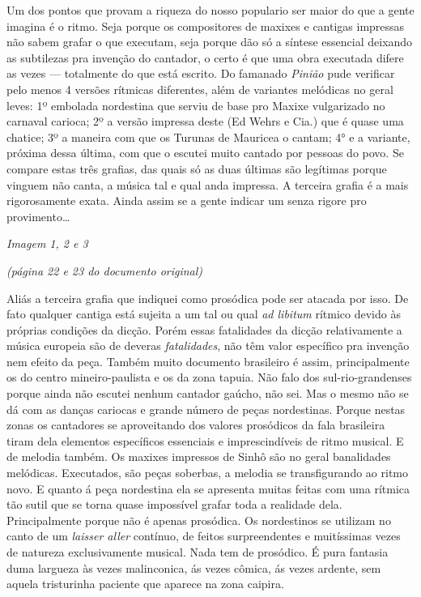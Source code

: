 Um dos pontos que provam a riqueza do nosso populario ser maior do que a
gente imagina é o ritmo. Seja porque os compositores de maxixes e
cantigas impressas não sabem grafar o que executam, seja porque dão só a
síntese essencial deixando as subtilezas pra invenção do cantador, o
certo é que uma obra executada difere as vezes --- totalmente do que
está escrito. Do famanado \emph{Pinião} pude verificar pelo menos 4
versões rítmicas diferentes, além de variantes melódicas no geral leves:
1º embolada nordestina que serviu de base pro Maxixe vulgarizado no
carnaval carioca; 2º a versão impressa deste (Ed Wehrs e Cia.) que é
quase uma chatice; 3º a maneira com que os Turunas de Mauricea o cantam;
4° e a variante, próxima dessa última, com que o escutei muito cantado
por pessoas do povo. Se compare estas três grafias, das quais só as duas
últimas são legítimas porque vinguem não canta, a música tal e qual anda
impressa. A terceira grafia é a mais rigorosamente exata. Ainda assim se
a gente indicar um senza rigore pro provimento\ldots{}

\emph{Imagem 1, 2 e 3}

\emph{(página 22 e 23 do documento original)}

Aliás a terceira grafia que indiquei como prosódica pode ser atacada por
isso. De fato qualquer cantiga está sujeita a um tal ou qual \emph{ad
libitum} rítmico devido às próprias condições da dicção. Porém essas
fatalidades da dicção relativamente a música europeia são de deveras
\emph{fatalidades}, não têm valor específico pra invenção nem efeito da
peça. Também muito documento brasileiro é assim, principalmente os do
centro mineiro-paulista e os da zona tapuia. Não falo dos
sul-rio-grandenses porque ainda não escutei nenhum cantador gaúcho, não
sei. Mas o mesmo não se dá com as danças cariocas e grande número de
peças nordestinas. Porque nestas zonas os cantadores se aproveitando dos
valores prosódicos da fala brasileira tiram dela elementos específicos
essenciais e imprescindíveis de ritmo musical. E de melodia também. Os
maxixes impressos de Sinhô são no geral banalidades melódicas.
Executados, são peças soberbas, a melodia se transfigurando ao ritmo
novo. E quanto á peça nordestina ela se apresenta muitas feitas com uma
rítmica tão sutil que se torna quase impossível grafar toda a realidade
dela. Principalmente porque não é apenas prosódica. Os nordestinos se
utilizam no canto de um \emph{laisser aller} contínuo, de feitos
surpreendentes e muitíssimas vezes de natureza exclusivamente musical.
Nada tem de prosódico. É pura fantasia duma largueza às vezes
malinconica, ás vezes cômica, ás vezes ardente, sem aquela tristurinha
paciente que aparece na zona caipira.


